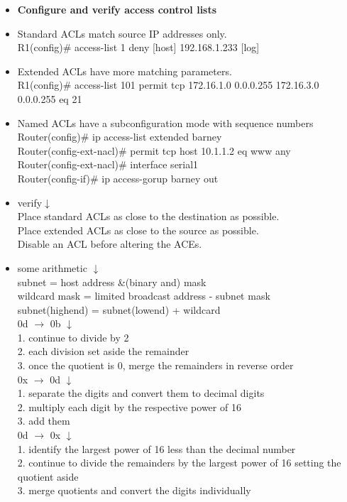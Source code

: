 \documentclass{article}
\begin{document}
\begin{itemize}
  \item \textbf{Configure and verify access control lists}
  	\item[] Standard ACLs match source IP addresses only.\\
  		R1(config)\# access-list 1 deny [host] 192.168.1.233 [log]
  	\item[] Extended ACLs have more matching parameters.\\
  		R1(config)\# access-list 101 permit tcp 172.16.1.0 0.0.0.255 172.16.3.0 0.0.0.255 eq 21
  	\item[] Named ACLs have a subconfiguration mode with sequence numbers\\
  		Router(config)\# ip access-list extended barney\\
  		Router(config-ext-nacl)\# permit tcp host 10.1.1.2 eq www any\\
  		Router(config-ext-nacl)\# interface serial1\\
  		Router(config-if)\# ip access-gorup barney out
  	\item[] verify$\downarrow$\\
  		Place standard ACLs as close to the destination as possible.\\
  		Place extended ACLs as close to the source as possible.\\
  		Disable an ACL before altering the ACEs.
  		
  	\item[] some arithmetic $\downarrow$\\
  		subnet = host address \&(binary and) mask\\ 
  		wildcard mask = limited broadcast address - subnet mask\\
  		subnet(highend) = subnet(lowend) + wildcard\\
  		0d $\rightarrow$ 0b $\downarrow$\\
  		1. continue to divide by 2\\
  		2. each division set aside the remainder\\
  		3. once the quotient is 0, merge the remainders in reverse order\\
  		0x $\rightarrow$ 0d $\downarrow$\\
  		1. separate the digits and convert them to decimal digits\\
  		2. multiply each digit by the respective power of 16\\
  		3. add them\\
  		0d $\rightarrow$ 0x $\downarrow$\\
  		1. identify the largest power of 16 less than the decimal number\\
  		2. continue to divide the remainders by the largest power of 16 setting the quotient aside\\
  		3. merge quotients and convert the digits individually
  		

\end{itemize}
\end{document}
